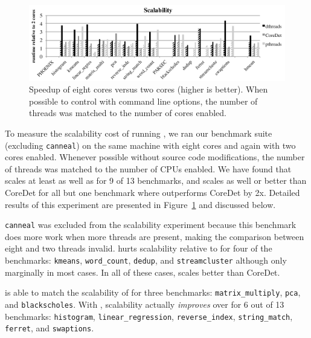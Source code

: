 \label{sec:scalability}

\begin{figure}
{\centering
\includegraphics[width=5in]{dthreads/figure/scalability-figure}
\caption{Speedup of eight cores versus two cores (higher is better).  When possible to control with command line options, the number of threads was matched to the number of cores enabled.\label{fig:scalability}}
}
\end{figure}

To measure the scalability cost of running \dthreads{}, we ran our benchmark suite (excluding \texttt{canneal}) on the same machine with eight cores and again with two cores enabled.  Whenever possible without source code modifications, the number of threads was matched to the number of CPUs enabled.  We have found that \dthreads{} scales at least as well as \pthreads{} for 9 of 13 benchmarks, and scales as well or better than CoreDet for all but one benchmark where \dthreads{} outperforms CoreDet by 2x.  Detailed results of this experiment are presented in Figure~\ref{fig:scalability} and discussed below.

\texttt{canneal} was excluded from the scalability experiment because this benchmark does more work when more threads are present, making the comparison between eight and two threads invalid.  \dthreads{} hurts scalability relative to \pthreads{} for four of the benchmarks: \texttt{kmeans}, \texttt{word\_count}, \texttt{dedup}, and \texttt{streamcluster} although only marginally in most cases.  In all of these cases, \dthreads{} scales better than CoreDet.

\dthreads{} is able to match the scalability of \pthreads{} for three benchmarks: \texttt{matrix\_multiply}, \texttt{pca}, and \texttt{blackscholes}.  With \dthreads{}, scalability actually \emph{improves} over \pthreads{} for 6 out of 13 benchmarks: \texttt{histogram}, \texttt{linear\_regression}, \texttt{reverse\_index}, \texttt{string\_match}, \texttt{ferret}, and \texttt{swaptions}.

